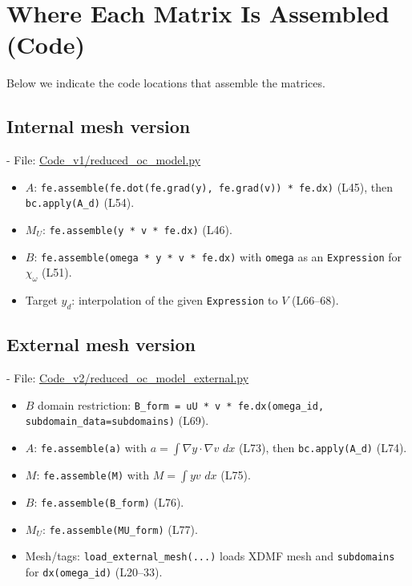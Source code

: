 \documentclass[11pt,a4paper]{article}
\newcommand{\dx}{\,dx}
\begin{document}
\section{Where Each Matrix Is Assembled (Code)}
Below we indicate the code locations that assemble the matrices.

\subsection*{Internal mesh version}
- File: \href{run:../Code_v1/reduced_oc_model.py}{Code\_v1/reduced\_oc\_model.py}
  \begin{itemize}
    \item $A$: \texttt{fe.assemble(fe.dot(fe.grad(y), fe.grad(v)) * fe.dx)} (L45), then \texttt{bc.apply(A\_d)} (L54).
    \item $M_U$: \texttt{fe.assemble(y * v * fe.dx)} (L46).
    \item $B$: \texttt{fe.assemble(omega * y * v * fe.dx)} with \texttt{omega} as an \texttt{Expression} for $\chi_\omega$ (L51).
    \item Target $y_d$: interpolation of the given \texttt{Expression} to $V$ (L66--68).
  \end{itemize}

\subsection*{External mesh version}
- File: \href{run:../Code_v2/reduced_oc_model_external.py}{Code\_v2/reduced\_oc\_model\_external.py}
  \begin{itemize}
    \item $B$ domain restriction: \texttt{B\_form = uU * v * fe.dx(omega\_id, subdomain\_data=subdomains)} (L69).
    \item $A$: \texttt{fe.assemble(a)} with $a=\int\nabla y\!\cdot\!\nabla v\,\dx$ (L73), then \texttt{bc.apply(A\_d)} (L74).
    \item $M$: \texttt{fe.assemble(M)} with $M=\int y v\,\dx$ (L75).
    \item $B$: \texttt{fe.assemble(B\_form)} (L76).
    \item $M_U$: \texttt{fe.assemble(MU\_form)} (L77).
    \item Mesh/tags: \texttt{load\_external\_mesh(...)} loads XDMF mesh and \texttt{subdomains} for \texttt{dx(omega\_id)} (L20--33).
  \end{itemize}
\end{document}
